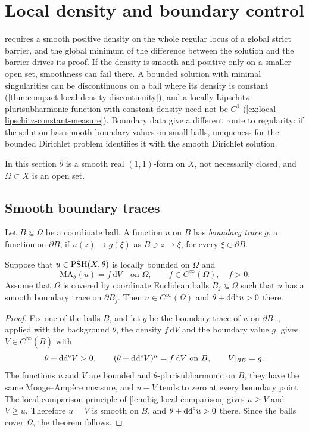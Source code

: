 \section{Local density and boundary control}
\label{sec:local-density-boundary}

 requires a smooth positive density on the whole regular locus of a global strict barrier, and the global minimum of the difference between the solution and the barrier drives its proof. If the density is smooth and positive only on a smaller open set, smoothness can fail there. A bounded solution with minimal singularities can be discontinuous on a ball where its density is constant (\cref{thm:compact-local-density-discontinuity}), and a locally Lipschitz plurisubharmonic function with constant density need not be $C^1$ (\cref{ex:local-lipschitz-constant-measure}). Boundary data give a different route to regularity: if the solution has smooth boundary values on small balls, uniqueness for the bounded Dirichlet problem identifies it with the smooth Dirichlet solution.

In this section $\theta$ is a smooth real $(1,1)$-form on $X$, not necessarily closed, and $\Omega\subset X$ is an open set.

\subsection{Smooth boundary traces}

Let $B\Subset\Omega$ be a coordinate ball. A function $u$ on $B$ has \emph{boundary trace} $g$, a function on $\partial B$, if $u(z)\to g(\xi)$ as $B\ni z\to\xi$, for every $\xi\in\partial B$.

\begin{theorem}\label{thm:smooth-boundary-trace-regularity}
Suppose that $u\in\mathrm{PSH}(X,\theta)$ is locally bounded on $\Omega$ and
\[
 \mathrm{MA}_\theta(u)=f\,\mathrm{d}V\quad\text{on }\Omega,
 \qquad f\in C^\infty(\Omega),\quad f>0.
\]
Assume that $\Omega$ is covered by coordinate Euclidean balls $B_j\Subset\Omega$ such that $u$ has a smooth boundary trace on $\partial B_j$. Then $u\in C^\infty(\Omega)$ and $\theta+\mathrm{dd}^{\mathrm{c}} u>0$ there.
\end{theorem}

\begin{proof}
Fix one of the balls $B$, and let $g$ be the boundary trace of $u$ on $\partial B$. , applied with the background $\theta$, the density $f\,\mathrm{d}V$ and the boundary value $g$, gives $V\in C^\infty(\overline B)$ with
\[
 \theta+\mathrm{dd}^{\mathrm{c}} V>0,\qquad (\theta+\mathrm{dd}^{\mathrm{c}} V)^n=f\,\mathrm{d}V\ \text{on }B,
 \qquad V|_{\partial B}=g.
\]
The functions $u$ and $V$ are bounded and $\theta$-plurisubharmonic on $B$, they have the same Monge--Amp\`ere measure, and $u-V$ tends to zero at every boundary point. The local comparison principle of \cref{lem:big-local-comparison} gives $u\geq V$ and $V\geq u$. Therefore $u=V$ is smooth on $B$, and $\theta+\mathrm{dd}^{\mathrm{c}} u>0$ there. Since the balls cover $\Omega$, the theorem follows.
\end{proof}

